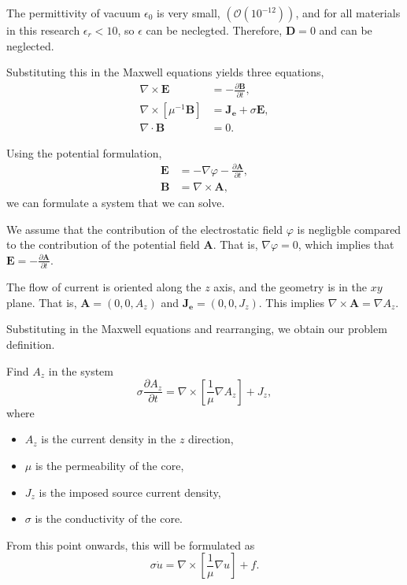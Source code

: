 \documentclass[11pt]{report}
\begin{document}
\begin{assumption}
    The permittivity of vacuum $\epsilon_0$ is very small, $(\mathcal{O}(10^{-12}))$, and for all materials in this research $\epsilon_r < 10$, so $\epsilon$ can be neclegted. Therefore, $\mathbf{D} = 0$ and can be neglected.
\end{assumption}

Substituting this in the Maxwell equations yields three equations,
\begin{align*}
    \nabla \times \mathbf{E} &= -\frac{\partial \mathbf{B}}{\partial t}, \\
    \nabla \times \left[\mu^{-1}\mathbf{B}\right] &=  \mathbf{J_e} + \sigma \mathbf{E}, \\
    \nabla \cdot \mathbf{B} &= 0.
\end{align*}

Using the potential formulation,
\begin{align*}
    \mathbf{E} &= -\nabla \varphi -\frac{\partial \mathbf{A}}{\partial t}, \\
    \mathbf{B} &= \nabla \times \mathbf A,
\end{align*}
we can formulate a system that we can solve.

\begin{assumption}
    We assume that the contribution of the electrostatic field $\varphi$ is negligble compared to the contribution of the potential field $\mathbf A$. That is, $\nabla \varphi = 0$, which implies that $\mathbf{E} = -\frac{\partial \mathbf{A}}{\partial t}$.
\end{assumption}

\begin{assumption}
    The flow of current is oriented along the $z$ axis, and the geometry is in the $xy$ plane. That is, $\mathbf{A} = (0, 0, A_z)$ and $\mathbf{J_e} = (0, 0, J_z)$. This implies $\nabla \times \mathbf A = \nabla A_z$.
\end{assumption}

Substituting in the Maxwell equations and rearranging, we obtain our problem definition.

\begin{problem}
    Find $A_z$ in the system
    \begin{equation}
        \sigma\frac{\partial A_z}{\partial t} = \nabla \times \left[\frac{1}{\mu}\nabla A_z\right] + J_z,
    \end{equation}
    where
    \begin{itemize}
        \item $A_z$ is the current density in the $z$ direction,
        \item $\mu$ is the permeability of the core,
        \item $J_z$ is the imposed source current density,
        \item $\sigma$ is the conductivity of the core.
    \end{itemize}
    From this point onwards, this will be formulated as
    \begin{equation}
        \sigma\dot u = \nabla \times \left[\frac{1}{\mu}\nabla u\right] + f.
    \end{equation}
\end{problem}
\end{document}
